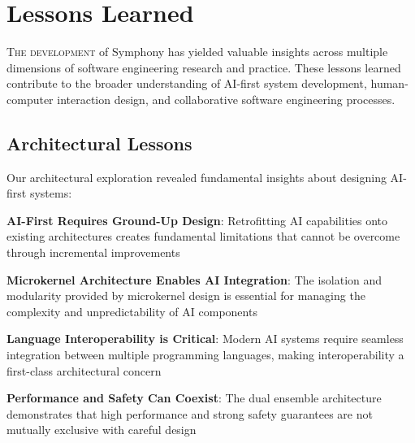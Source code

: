 
\section*{Lessons Learned}

\lettrine{T}{he development} of Symphony has yielded valuable insights across multiple dimensions of software engineering research and practice. These lessons learned contribute to the broader understanding of AI-first system development, human-computer interaction design, and collaborative software engineering processes.

\subsection*{Architectural Lessons}

Our architectural exploration revealed fundamental insights about designing AI-first systems:

\begin{expandedlist}
    \item \textbf{AI-First Requires Ground-Up Design}: Retrofitting AI capabilities onto existing architectures creates fundamental limitations that cannot be overcome through incremental improvements
    \item \textbf{Microkernel Architecture Enables AI Integration}: The isolation and modularity provided by microkernel design is essential for managing the complexity and unpredictability of AI components
    \item \textbf{Language Interoperability is Critical}: Modern AI systems require seamless integration between multiple programming languages, making interoperability a first-class architectural concern
    \item \textbf{Performance and Safety Can Coexist}: The dual ensemble architecture demonstrates that high performance and strong safety guarantees are not mutually exclusive with careful design
\end{expandedlist}

